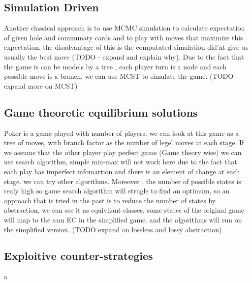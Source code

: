\documentclass{article}
\begin{document}
\subsection{Simulation Driven}
Another classical approach is to use MCMC simulation to calculate expectation of given hole and communaty cards and to play with moves that maximize this expectation.
the disadvantage of this is the computated simulation did'nt give us usually the best move (TODO - expand and explain why).
Due to the fact that the game is can be models by a tree , each player turn is a node and each possible move is a branch, we can use MCST to simulate the game.
(TODO - expand more on MCST)
\subsection{Game theoretic equilibrium solutions}
Poker is a game played with number of players. we can look at this game as a tree of moves, with branch factor as the number of legel moves at each stage.
If we assume that the other player play perfect game (Game theory wise) we can use search algorithm, simple min-max will not work here due to the fact
that each play has imperfect infomartion and there is an element of change at each stage. we can try other algorithms.
Moreover , the number of possible states is realy high so game search algorithm will strugle to find an optimum, so an approach that is tried in the past is to reduce
the number of states by abstraction, we can see it as equivliant classes, some states of the original game will map to the sam EC in the simplified game.
and the algorithms will run on the simplified version. (TODO expand on lossless and lossy abstraction)
\subsection{Exploitive counter-strategies}
a
\end{document}
